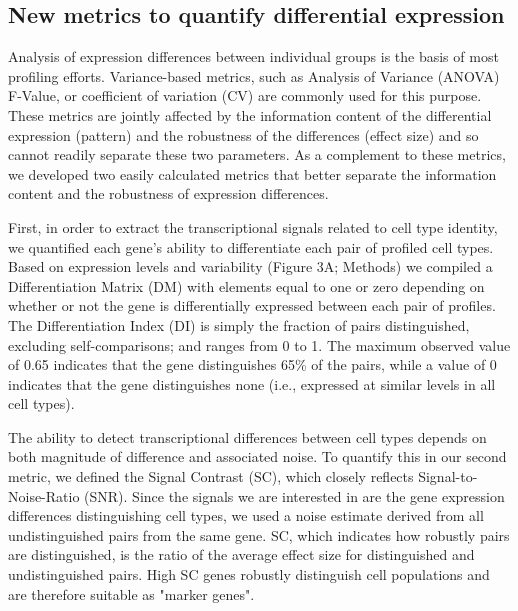 \subsection{New metrics to quantify differential expression}

Analysis of expression differences between individual groups is the basis of most profiling efforts. Variance-based metrics, such as Analysis of Variance (ANOVA) F-Value, or coefficient of variation (CV) are commonly used for this purpose. These metrics are jointly affected by the information content of the differential expression (pattern) and the robustness of the differences (effect size) and so cannot readily separate these two parameters. As a complement to these metrics, we developed two easily calculated metrics that better separate the information content and the robustness of expression differences. 

First, in order to extract the transcriptional signals related to cell type identity, we quantified each gene's ability to differentiate each pair of profiled cell types. Based on expression levels and variability (Figure 3A; Methods) we compiled a Differentiation Matrix (DM) with elements equal to one or zero depending on whether or not the gene is differentially expressed between each pair of profiles. The Differentiation Index (DI) is simply the fraction of pairs distinguished, excluding self-comparisons; and ranges from 0 to 1. The maximum observed value of 0.65 indicates that the gene distinguishes 65\% of the pairs, while a value of 0 indicates that the gene distinguishes none (i.e., expressed at similar levels in all cell types).

The ability to detect transcriptional differences between cell types depends on both magnitude of difference and associated noise. To quantify this in our second metric, we defined the Signal Contrast (SC), which closely reflects Signal-to-Noise-Ratio (SNR). Since the signals we are interested in are the gene expression differences distinguishing cell types, we used a noise estimate derived from all undistinguished pairs from the same gene. SC, which indicates how robustly pairs are distinguished, is the ratio of the average effect size for distinguished and undistinguished pairs. High SC genes robustly distinguish cell populations and are therefore suitable as "marker genes". 

